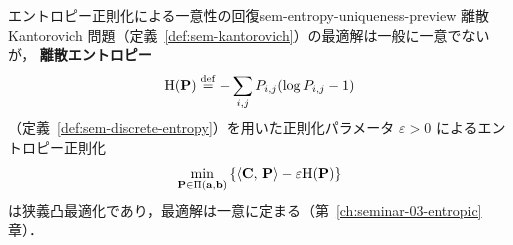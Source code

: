 \begin{remark}{エントロピー正則化による一意性の回復}{sem-entropy-uniqueness-preview}
  離散 Kantorovich 問題（定義~\ref{def:sem-kantorovich}）の最適解は一般に一意でないが，
  \textbf{離散エントロピー}
  \[
    \mathrm{H}(\mathbf{P}) \overset{\mathrm{def}}{=} -\sum_{i,j} P_{i,j}(\log P_{i,j} - 1)
  \]
  （定義~\ref{def:sem-discrete-entropy}）を用いた正則化パラメータ $\varepsilon > 0$
  によるエントロピー正則化
  \[
    \min_{\mathbf{P} \in \Pi(\mathbf{a}, \mathbf{b})}
    \left\{
      \langle \mathbf{C},\, \mathbf{P} \rangle
      - \varepsilon \mathrm{H}(\mathbf{P})
    \right\}
  \]
  は狭義凸最適化であり，最適解は一意に定まる（第~\ref{ch:seminar-03-entropic}章）．
\end{remark}


